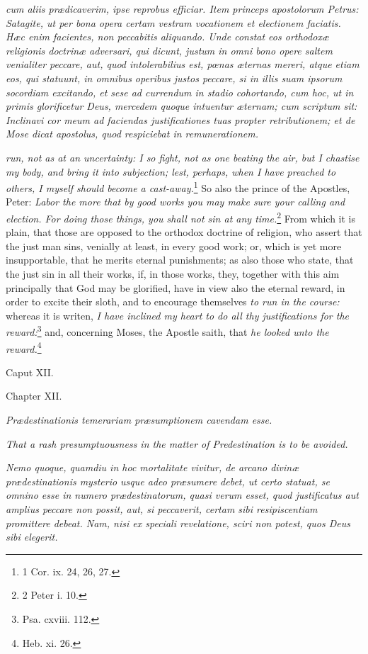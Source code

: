 \emph{cum aliis prædicaverim, ipse reprobus efficiar. Item princeps apostolorum Petrus: Satagite, ut per bona opera certam vestram vocationem et electionem faciatis. Hæc enim facientes, non peccabitis aliquando. Unde constat eos orthodoxæ religionis doctrinæ adversari, qui dicunt, justum in omni bono opere saltem venialiter peccare, aut, quod intolerabilius est, pœnas æternas mereri, atque etiam eos, qui statuunt, in omnibus operibus justos peccare, si in illis suam ipsorum socordiam excitando, et sese ad currendum in stadio cohortando, cum hoc, ut in primis glorificetur Deus, mercedem quoque intuentur æternam; cum scriptum sit: Inclinavi cor meum ad faciendas justificationes tuas propter retributionem; et de Mose dicat apostolus, quod respiciebat in remunerationem.}

\emph{run, not as at an uncertainty: I so fight, not as one beating the air, but I chastise my body, and bring it into subjection; lest, perhaps, when I have preached to others, I myself should become a cast-away.}\footnote{\par  1 Cor. ix. 24, 26, 27.} So also the prince of the Apostles, Peter: \emph{Labor the more that by good works you may make sure your calling and election. For doing those things, you shall not sin at any time.}\footnote{\par   2 Peter i. 10.} From which it is plain, that those are opposed to the orthodox doctrine of religion, who assert that the just man sins, venially at least, in every good work; or, which is yet more insupportable, that he merits eternal punishments; as also those who state, that the just sin in all their works, if, in those works, they, together with this aim principally that God may be glorified, have in view also the eternal reward, in order to excite their sloth, and to encourage themselves \emph{to run in the course:} whereas it is writen, \emph{I have inclined my heart to do all thy justifications for the reward:}\footnote{\par   Psa. cxviii. 112.} and, concerning Moses, the Apostle saith, that \emph{he looked unto the reward.}\footnote{\par   Heb. xi. 26.}

Caput XII.

Chapter XII.

\emph{Prædestinationis temerariam præsumptionem cavendam esse.}

\emph{That a rash presumptuousness in the matter of Predestination is to be avoided.}

\emph{Nemo quoque, quamdiu in hoc mortalitate vivitur, de arcano divinæ prædestinationis mysterio usque adeo præsumere debet, ut certo statuat, se omnino esse in numero prædestinatorum, quasi verum esset, quod justificatus aut amplius peccare non possit, aut, si peccaverit, certam sibi resipiscentiam promittere debeat. Nam, nisi ex speciali revelatione, sciri non potest, quos Deus sibi elegerit.}

